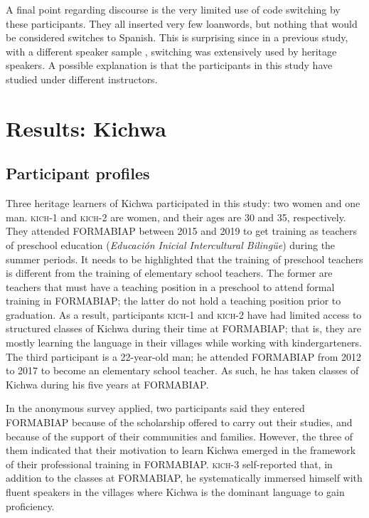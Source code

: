 \documentclass[output=paper]{langscibook}
\begin{document}
A final point regarding discourse is the very limited use of code switching by these participants. They all inserted very few loanwords, but nothing that would be considered switches to Spanish. This is surprising since in a previous study, with a different speaker sample \citep{Vallejos2016b}, switching was extensively used by heritage speakers. A possible explanation is that the participants in this study have studied under different instructors.

\section{{Results: Kichwa} }\label{sec:7:6}
\subsection{{{Participant profiles}}}

Three heritage learners of Kichwa participated in this study: two women and one man. \textsc{kich}{}-1 and \textsc{kich}{}-2 are women, and their ages are 30 and 35, respectively. They attended FORMABIAP between 2015 and 2019 to get training as teachers of preschool education (\textit{Educación Inicial Intercultural Bilingüe}) during the summer periods. It needs to be highlighted that the training of preschool teachers is different from the training of elementary school teachers. The former are teachers that must have a teaching position in a preschool to attend formal training in FORMABIAP; the latter do not hold a teaching position prior to graduation. As a result, participants \textsc{kich}{}-1 and \textsc{kich}{}-2 have had limited access to structured classes of Kichwa during their time at FORMABIAP; that is, they are mostly learning the language in their villages while working with kindergarteners. The third participant is a 22-year-old man; he attended FORMABIAP from 2012 to 2017 to become an elementary school teacher. As such, he has taken classes of Kichwa during his five years at FORMABIAP.

\begin{sloppypar}
In the anonymous survey applied, two participants said they entered FORMABIAP because of the scholarship offered to carry out their studies, and because of the support of their communities and families. However, the three of them indicated that their motivation to learn Kichwa emerged in the framework of their professional training in FORMABIAP. \textsc{kich}{}-3 self-reported that, in addition to the classes at FORMABIAP, he systematically immersed himself with fluent speakers in the villages where Kichwa is the dominant language to gain proficiency.
\end{sloppypar}
\end{document}

